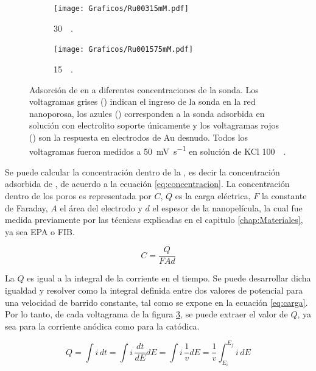 \begin{figure}[th]
\begin{subfigure}[t]{0.325\textwidth}
			        	\texttt{[image: Graficos/Ru00315mM.pdf]}
			       		\vspace*{-0.40cm}\caption{\aminorutenio\space \SI{30}{\micro\Molar}.}
			         	\label{fig:Ru00315mM}
			     		\end{subfigure}
		     		\begin{subfigure}[t]{0.325\textwidth}
			        	\texttt{[image: Graficos/Ru001575mM.pdf]}
			       		\vspace*{-0.40cm}\caption{\aminorutenio\space \SI{15}{\micro\Molar}.}
			         	\label{fig:Ru001575mM}
			     		\end{subfigure}	
		 	   	   	\caption[Preconcentración de \aminorutenio\space en \pdmF]{Adsorción de \ru\space en \pdm\space a diferentes concentraciones de la sonda. Los voltagramas grises (\usebox{\gris}) indican el ingreso de la sonda en la red nanoporosa, los azules (\usebox{\azul}) corresponden a la sonda adsorbida en solución con electrolito soporte únicamente y los voltagramas rojos (\usebox{\rojo}) son la respuesta en electrodos de Au desnudo. Todos los voltagramas fueron medidos a \SI{50}{\milli\volt\per\second} en solución de KCl \SI{100}{\milli\Molar}.}
		     		\label{fig:preconcentraciones}
		     	   	\end{figure} 	

		Se puede calcular la concentración dentro de la \pdm, es decir la concentración adsorbida de \ru, de acuerdo a la ecuación \ref{eq:concentracion}. La concentración dentro de los poros es representada por $C$, $Q$ es la carga eléctrica, $F$ la constante de Faraday, $A$ el área del electrodo y $d$ el espesor de la nanopelícula, la cual fue medida previamente por las técnicas explicadas en el capitulo \ref{chap:Materiales}, ya sea EPA o FIB.

			\begin{equation}
					C=\frac{Q}{FAd}
					\label{eq:concentracion}
			\end{equation}

		La $Q$ es igual a la integral de la corriente en el tiempo. Se puede desarrollar dicha igualdad y resolver como la integral definida entre dos valores de potencial para una velocidad de barrido constante, tal como se expone en la ecuación \ref{eq:carga}. Por lo tanto, de cada voltagrama de la figura \ref{fig:preconcentraciones}, se puede extraer el valor de $Q$, ya sea para la corriente anódica como para la catódica.
		
			\begin{equation}
					Q=\int i\,dt = \int i\, \frac{dt}{dE} dE = \int i\,\frac{1}{v}dE=\frac{1}{v}\int_{E_{i}}^{E_{f}} i\,dE
					\label{eq:carga}
			\end{equation}


